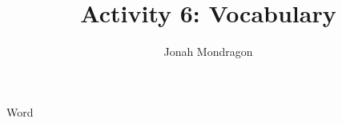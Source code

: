 \documentclass[12pt]{article}
\title{Activity 6: Vocabulary}
\author{Jonah Mondragon}
\begin{document}
\maketitle


\begin{table}[ht]

\caption{Word}

\end{table}
\end{document}
